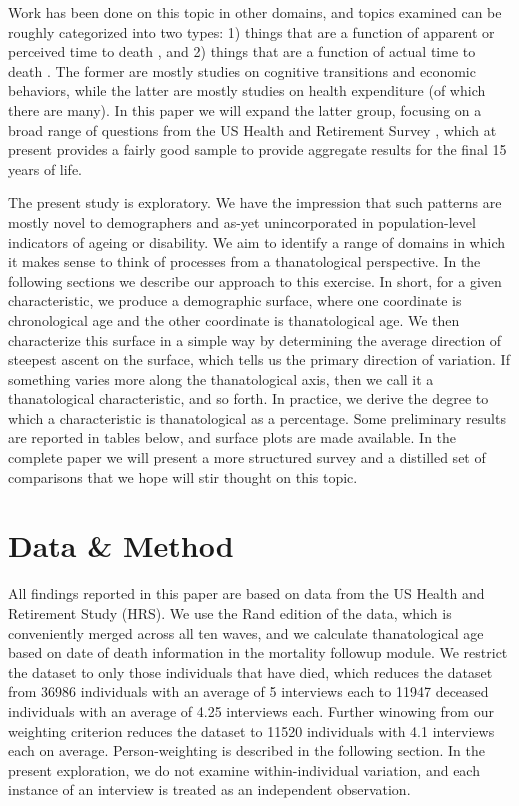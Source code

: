 \documentclass{article}
\begin{document}
Work has been done on this topic in other domains, and
topics examined can be roughly categorized into two types: 1) things that are a
function of apparent or perceived time to death
\citep{carstensen2006influence,gan2004subjective,salm2010subjective,van2010living}, and 2) things that are a function of actual time to death
\citep{miller2001increasing,seshamani2004longitudinal}. The former are mostly
studies on cognitive transitions and economic behaviors, while the latter are
mostly studies on health expenditure (of which there are many). In this paper we
will expand the latter group, focusing on a broad range of questions from the US
Health and Retirement Survey \citep{HRS}, which at present provides a fairly
good sample to provide aggregate results for the final 15 years of life.

The present study is exploratory. We have the impression
that such patterns are mostly novel to demographers and as-yet unincorporated in
population-level indicators of ageing or disability. We aim to identify a
range of domains in which it makes sense to think of processes from a
thanatological perspective. In the following sections we describe our
approach to this exercise. In short, for a given characteristic, we produce a
demographic surface, where one coordinate is chronological age and the other
coordinate is thanatological age. We then characterize this surface in a simple
way by determining the average direction of steepest ascent on the surface,
which tells us the primary direction of variation. If something varies more
along the thanatological axis, then we call it a thanatological characteristic,
and so forth. In practice, we derive the degree to which a characteristic is
thanatological as a percentage. Some preliminary results are reported in tables
below, and surface plots are made available.
In the complete paper we will present a more structured survey and a distilled
set of comparisons that we hope will stir thought on this topic.

\section{Data \& Method}
All findings reported in this paper are based on data from the US Health and
Retirement Study (HRS). We use the Rand edition of the data, which is
conveniently merged across all ten waves, and we calculate thanatological age
based on date of death information in the mortality followup module. We
restrict the dataset to only those individuals that have died, which reduces the
dataset from 36986 individuals with an average of 5 interviews each to 11947
deceased individuals with an average of 4.25 interviews each. Further winowing
from our weighting criterion reduces the dataset to
11520 individuals with 4.1 interviews each on average. Person-weighting is
described in the following section. In the present exploration, we do not examine
within-individual variation, and each instance of an interview is treated as an
independent observation.
\end{document}
